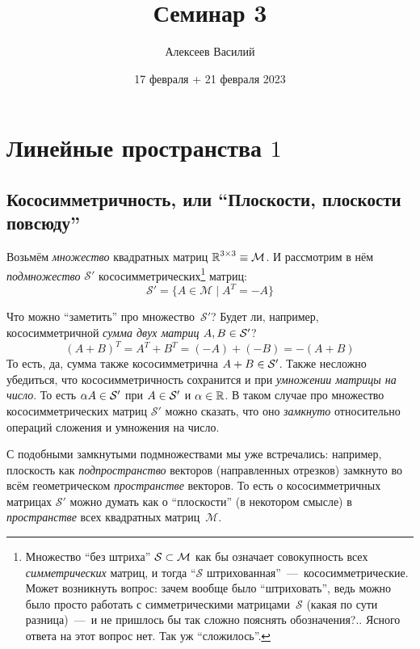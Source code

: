 \documentclass[a4paper,12pt]{article}
\author{Алексеев Василий}
\title{Семинар 3}
\date{17 февраля + 21 февраля 2023}
\newcommand{\Coso}{\mathcal S'}
\begin{document}
  \maketitle
  
  \tableofcontents

  \thispagestyle{empty}
  
  \newpage
  


  \section{Линейные пространства $1$}
  
  \subsection{Кососимметричность, или ``Плоскости, плоскости повсюду''}
  
  Возьмём \emph{множество} квадратных матриц $\RR^{3 \times 3} \hm\equiv \mathcal M$.
  И рассмотрим в нём \emph{подмножество} $\mathcal S'$ кососимметрических\footnote{Множество ``без штриха'' $\mathcal S \hm\subset \mathcal M$ как бы означает совокупность всех \emph{симметрических} матриц, и тогда ``$\mathcal S$ штрихованная''~---~кососимметрические. Может возникнуть вопрос: зачем вообще было ``штриховать'', ведь можно было просто работать с симметрическими матрицами~$\mathcal S$ (какая по сути разница)~---~и не пришлось бы так сложно пояснять обозначения?.. Ясного ответа на этот вопрос нет. Так уж ``сложилось''.} матриц:
  \[
    \Coso = \{A \in \mathcal M \mid A^T = -A\}
  \]
  
  Что можно ``заметить'' про множество~$\Coso$?
  Будет ли, например, кососимметричной \emph{сумма двух матриц} $A, B \hm\in \Coso$?
  \[
    (A + B)^T = A^T + B^T = (-A) + (-B) = -(A + B)
  \]
  То есть, да, сумма также кососимметрична $A \hm+ B \hm\in \Coso$.
  Также несложно убедиться, что кососимметричность сохранится и при \emph{умножении матрицы на число}.
  То есть $\alpha A \hm\in \Coso$ при $A \hm\in \Coso$ и $\alpha \hm\in \RR$.
  В таком случае про множество кососимметрических матриц $\Coso$ можно сказать, что оно \emph{замкнуто} относительно операций сложения и умножения на число.
  
  С подобными замкнутыми подмножествами мы уже встречались: например, плоскость как \emph{подпространство} векторов (направленных отрезков) замкнуто во всём геометрическом \emph{пространстве} векторов.
  То есть о кососимметричных матрицах $\Coso$ можно думать как о ``плоскости'' (в некотором смысле) в \emph{пространстве} всех квадратных матриц~$\mathcal M$.
  
\end{document}

